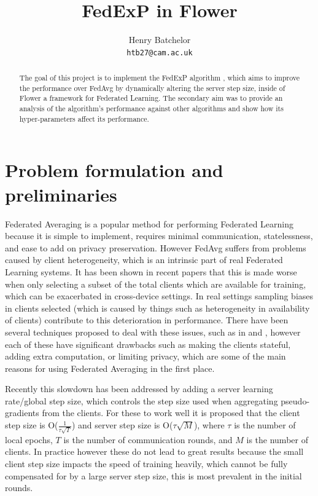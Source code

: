\documentclass{article}
\title{FedExP in Flower}
\author{%
  Henry Batchelor\\
  \texttt{htb27@cam.ac.uk} \\
}
\begin{document}
\maketitle

\begin{abstract}
  The goal of this project is to implement the FedExP algorithm \cite{FedExP}, which aims to improve the performance over FedAvg by dynamically altering the server step size, inside of Flower \cite{beutel2020flower} a framework for Federated Learning.  The secondary aim was to provide an analysis of the algorithm's performance against other algorithms and show how its hyper-parameters affect its performance.
\end{abstract}

\section{Problem formulation and preliminaries}

Federated Averaging is a popular method for performing Federated Learning because it is simple to implement, requires minimal communication, statelessness, and ease to add on privacy preservation.  However FedAvg suffers from problems caused by client heterogeneity, which is an intrinsic part of real Federated Learning systems.  It has been shown in recent papers \cite{FewerClientsWorseBehaviour} that this is made worse when only selecting a subset of the total clients which are available for training, which can be exacerbated in cross-device settings.  In real settings sampling biases in clients selected (which is caused by things such as heterogeneity in availability of clients) contribute to this deterioration in performance.  There have been several techniques proposed to deal with these issues, such as in \cite{signSGD} and \cite{ProxSkip}, however each of these have significant drawbacks such as making the clients stateful, adding extra computation, or limiting privacy, which are some of the main reasons for using Federated Averaging in the first place.  

Recently this slowdown has been addressed by adding a server learning rate/global step size, which controls the step size used when aggregating pseudo-gradients from the clients. \cite{AdaptiveFederatedOptimisation}  For these to work well it is proposed that the client step size is O($\frac{1}{\tau\sqrt{T}}$) and server step size is O($\tau\sqrt{M}$), where $\tau$ is the number of local epochs, $T$ is the number of communication rounds, and $M$ is the number of clients.  In practice however these do not lead to great results because the small client step size impacts the speed of training heavily, which cannot be fully compensated for by a large server step size, this is most prevalent in the initial rounds.
\end{document}
